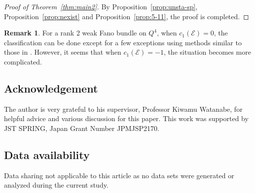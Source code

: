 \documentclass{amsproc}
\theoremstyle{definition}
\newtheorem{remark}[theorem]{Remark}
\begin{document}
\begin{proof}[Proof of Theorem~\ref{thm:main2}]
By Proposition~\ref{prop:unsta-sp}, Proposition~\ref{prop:nexist} and Proposition~\ref{prop:5-11}, the proof is  completed.
\end{proof}

\begin{remark}
For a rank 2 weak Fano bundle on $Q^4$, when $c_1(\mathcal{E}) = 0$, the classification can be done except for a few exceptions using methods similar to those in \cite{APW94}. However, it seems  that when $c_1(\mathcal{E}) = -1$, the situation becomes more complicated.
\end{remark}

\subsection*{Acknowledgement}The author is very grateful to his supervisor, Professor Kiwamu Watanabe, for helpful advice and various discussion for this paper. This work was supported by JST SPRING, Japan Grant Number JPMJSP2170.
\subsection*{Data availability}Data sharing not applicable to this article as no data sets were
generated or analyzed during the current study.

\end{document}
